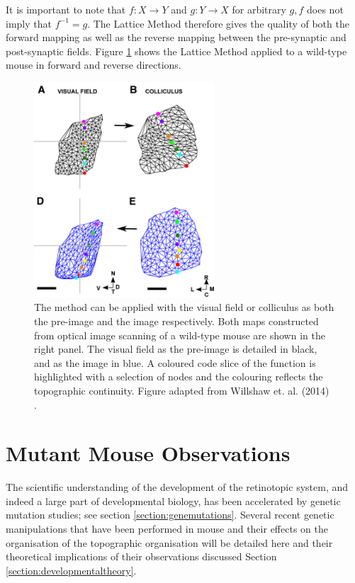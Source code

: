 It is important to note that $f: X \rightarrow Y$ and $g: Y \rightarrow X$ for arbitrary $g, f$ does not imply that $f^{-1} = g$. The Lattice Method therefore gives the quality of both the forward mapping as well as the reverse mapping between the pre-synaptic and post-synaptic fields. Figure \ref{fig:lattice_results} shows the Lattice Method applied to a wild-type mouse in forward and reverse directions.
\begin{figure}[h!]
	\centering
	\includegraphics[width = 0.6\textwidth]{images/introduction/lattice_results}
	\def\c{The method can be applied with the visual field or colliculus as both the pre-image and the image respectively. }
	\caption[\c]{ \c Both maps constructed from optical image scanning of a wild-type mouse are shown in the right panel. The visual field as the pre-image is detailed in black,  and as the image in blue. A coloured code slice of the function is highlighted with a selection of nodes and the colouring reflects the topographic continuity. Figure adapted from Willshaw et. al. (2014) \cite{Willshaw2014-ms}. \label{fig:lattice_results}  }
\end{figure}

\FloatBarrier
\section{Mutant Mouse Observations}
The scientific understanding of the development of the retinotopic system, and indeed a large part of developmental biology, has been accelerated by genetic mutation studies; see section \ref{section:genemutations}. Several recent genetic manipulations that have been performed in mouse and their effects on the organisation of the topographic organisation will be detailed here and their theoretical implications of their observations discussed Section \ref{section:developmentaltheory}.
